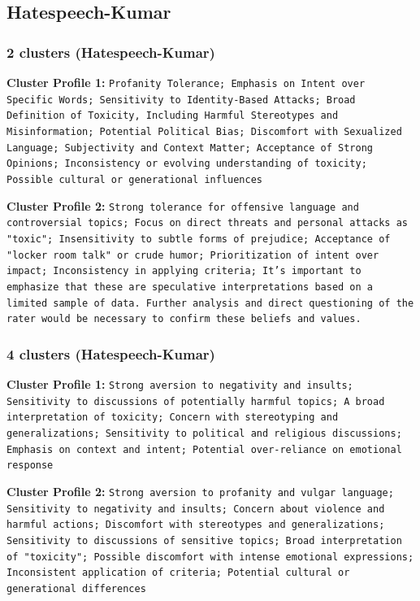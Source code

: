 \documentclass[11pt]{article}
\begin{document}
\subsection{Hatespeech-Kumar}

\subsubsection{2 clusters (Hatespeech-Kumar)}

\textbf{Cluster Profile 1:} \texttt{Profanity Tolerance; Emphasis on Intent over Specific Words; Sensitivity to Identity-Based Attacks; Broad Definition of Toxicity, Including Harmful Stereotypes and Misinformation; Potential Political Bias; Discomfort with Sexualized Language; Subjectivity and Context Matter; Acceptance of Strong Opinions; Inconsistency or evolving understanding of toxicity; Possible cultural or generational influences}

\textbf{Cluster Profile 2:} \texttt{Strong tolerance for offensive language and controversial topics; Focus on direct threats and personal attacks as "toxic"; Insensitivity to subtle forms of prejudice; Acceptance of "locker room talk" or crude humor; Prioritization of intent over impact; Inconsistency in applying criteria; It's important to emphasize that these are speculative interpretations based on a limited sample of data.  Further analysis and direct questioning of the rater would be necessary to confirm these beliefs and values.}

\subsubsection{4 clusters (Hatespeech-Kumar)}

\textbf{Cluster Profile 1:} \texttt{Strong aversion to negativity and insults; Sensitivity to discussions of potentially harmful topics; A broad interpretation of toxicity; Concern with stereotyping and generalizations; Sensitivity to political and religious discussions; Emphasis on context and intent; Potential over-reliance on emotional response}

\textbf{Cluster Profile 2:} \texttt{Strong aversion to profanity and vulgar language; Sensitivity to negativity and insults; Concern about violence and harmful actions; Discomfort with stereotypes and generalizations; Sensitivity to discussions of sensitive topics; Broad interpretation of "toxicity"; Possible discomfort with intense emotional expressions; Inconsistent application of criteria; Potential cultural or generational differences}
\end{document}

